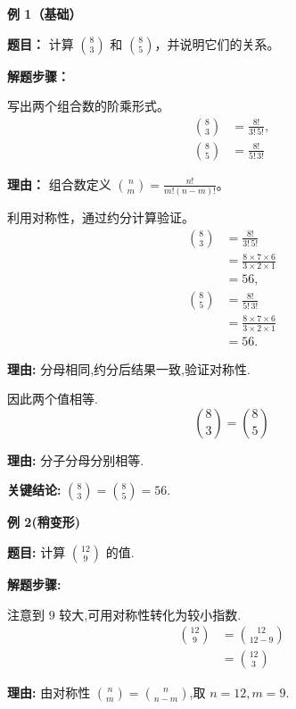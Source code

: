 \begin{examplebox}
	\textbf{\textcolor{CExample}{例 1（基础）}}

	\textbf{\textcolor{CExample}{题目：}}
	计算 $\binom{8}{3}$ 和 $\binom{8}{5}$，并说明它们的关系。

	\textbf{\textcolor{CExample}{解题步骤：}}
	\begin{description}[style=nextline, leftmargin=2.8em, labelsep=0.5em, itemsep=0.45em]
		\item[\textbf{第一步（公式展开）：}] 写出两个组合数的阶乘形式。
			\[
				\begin{aligned}
					\binom{8}{3} &= \frac{8!}{3!\,5!},\\
					\binom{8}{5} &= \frac{8!}{5!\,3!}
			\end{aligned}
			\]
			\par\textbf{理由：}
			组合数定义 $\binom{n}{m}=\frac{n!}{m!(n-m)!}$。

		\item[\textbf{第二步（计算数值）：}] 利用对称性，通过约分计算验证。
			\[
				\begin{aligned}
					\binom{8}{3} &= \frac{8!}{3!\,5!} \\
					&= \frac{8\times7\times6}{3\times2\times1} \\
					&= 56,\\[4pt]
					\binom{8}{5} &= \frac{8!}{5!\,3!} \\
					&= \frac{8\times7\times6}{3\times2\times1} \\
					&= 56.
			\end{aligned}
			\]
			\par\textbf{理由:}
			分母相同,约分后结果一致,验证对称性.

		\item[\textbf{第三步(得出结论):}] 因此两个值相等.
			\[
				\binom{8}{3} = \binom{8}{5}
			\]
			\par\textbf{理由:}
			分子分母分别相等.
	\end{description}

	\textbf{\textcolor{CExample}{关键结论:}}
	\textbf{$\binom{8}{3}=\binom{8}{5}=56$}.

	\medskip
	\textbf{\textcolor{CExample}{例 2(稍变形)}}

	\textbf{\textcolor{CExample}{题目:}}
	计算 $\binom{12}{9}$ 的值.

	\textbf{\textcolor{CExample}{解题步骤:}}
	\begin{description}[style=nextline, leftmargin=2.8em, labelsep=0.5em, itemsep=0.45em]
		\item[\textbf{第一步(识别大数):}] 注意到 $9$ 较大,可用对称性转化为较小指数.
			\[
				\begin{aligned}
					\binom{12}{9} &= \binom{12}{12-9} \\
					&= \binom{12}{3}
			\end{aligned}
			\]
			\par\textbf{理由:}
			由对称性 $\binom{n}{m}=\binom{n}{n-m}$,取 $n=12,m=9$.


\end{description}
\end{examplebox}
